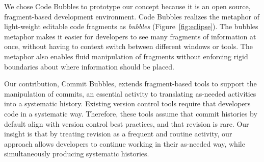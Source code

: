 \documentclass[conference]{IEEEtran}
\begin{document}
We chose Code Bubbles to prototype our concept because it is an open source, fragment-based development environment. Code Bubbles realizes the metaphor of light-weight editable code fragments as \emph{bubbles} (Figure~\ref{fig:eclipse}). The bubbles metaphor makes it easier for developers to see many fragments of information at once, without having to context switch between different windows or tools. The metaphor also enables fluid manipulation of fragments without enforcing rigid boundaries about where information should be placed.







Our contribution, Commit Bubbles, extends fragment-based tools to support the manipulation of commits, an essential activity to translating as-needed activities into a systematic history. Existing version control tools require that developers code in a systematic way. Therefore, these tools assume
that commit histories by default align with version control best practices, and that revision is rare.
Our insight is that by treating revision as a frequent and routine activity, our approach allows developers to continue working in their as-needed way, while simultaneously producing systematic histories. 
\end{document}
